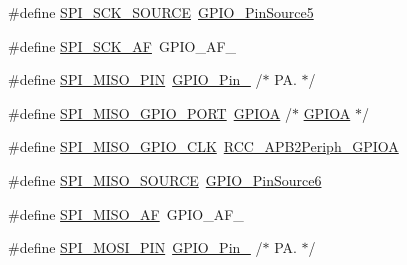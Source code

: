 \begin{DoxyCompactItemize}
\item 
\#define \mbox{\hyperlink{group___s_t_m32_f1_x_x___n_u_c_l_e_o___l_o_w___l_e_v_e_l___s_p_i_ga33462f091911471d16a53fc89f337bca}{S\+P\+I\+\_\+\+S\+C\+K\+\_\+\+S\+O\+U\+R\+CE}}~\mbox{\hyperlink{group___g_p_i_o___pin__sources_gaf231e680fe2db4ea44a7fd0f5d5c5875}{G\+P\+I\+O\+\_\+\+Pin\+Source5}}
\item 
\#define \mbox{\hyperlink{group___s_t_m32_f1_x_x___n_u_c_l_e_o___l_o_w___l_e_v_e_l___s_p_i_ga79bd6531cc6913eeae2c8e1b8375d9e3}{S\+P\+I\+\_\+\+S\+C\+K\+\_\+\+AF}}~G\+P\+I\+O\+\_\+\+A\+F\+\_
\item 
\#define \mbox{\hyperlink{group___s_t_m32_f1_x_x___n_u_c_l_e_o___l_o_w___l_e_v_e_l___s_p_i_ga315722498711fce1e1aa6ea6654385cf}{S\+P\+I\+\_\+\+M\+I\+S\+O\+\_\+\+P\+IN}}~\mbox{\hyperlink{group___g_p_i_o__pins__define_gaf047899d873f27c2db9f50b342e35a58}{G\+P\+I\+O\+\_\+\+Pin\+\_}}                  /$\ast$ P\+A. $\ast$/
\item 
\#define \mbox{\hyperlink{group___s_t_m32_f1_x_x___n_u_c_l_e_o___l_o_w___l_e_v_e_l___s_p_i_ga7c73b5516fc191a0050bf4592cd648d5}{S\+P\+I\+\_\+\+M\+I\+S\+O\+\_\+\+G\+P\+I\+O\+\_\+\+P\+O\+RT}}~\mbox{\hyperlink{group___peripheral__declaration_gac485358099728ddae050db37924dd6b7}{G\+P\+I\+OA}}                       /$\ast$ \mbox{\hyperlink{group___peripheral__declaration_gac485358099728ddae050db37924dd6b7}{G\+P\+I\+OA}} $\ast$/
\item 
\#define \mbox{\hyperlink{group___s_t_m32_f1_x_x___n_u_c_l_e_o___l_o_w___l_e_v_e_l___s_p_i_gaecf0405dce1d881f2d9ecb9e40f9ecb1}{S\+P\+I\+\_\+\+M\+I\+S\+O\+\_\+\+G\+P\+I\+O\+\_\+\+C\+LK}}~\mbox{\hyperlink{group___a_p_b2__peripheral_ga44b92fbf2e288796b1acbce2708f3636}{R\+C\+C\+\_\+\+A\+P\+B2\+Periph\+\_\+\+G\+P\+I\+OA}}
\item 
\#define \mbox{\hyperlink{group___s_t_m32_f1_x_x___n_u_c_l_e_o___l_o_w___l_e_v_e_l___s_p_i_ga178d4862e1bc8af450c3dabcd27c0ff7}{S\+P\+I\+\_\+\+M\+I\+S\+O\+\_\+\+S\+O\+U\+R\+CE}}~\mbox{\hyperlink{group___g_p_i_o___pin__sources_gada41b6bd03b2873a2400628df0a1026e}{G\+P\+I\+O\+\_\+\+Pin\+Source6}}
\item 
\#define \mbox{\hyperlink{group___s_t_m32_f1_x_x___n_u_c_l_e_o___l_o_w___l_e_v_e_l___s_p_i_ga2827f5955adc05e0505e5b19f8eec813}{S\+P\+I\+\_\+\+M\+I\+S\+O\+\_\+\+AF}}~G\+P\+I\+O\+\_\+\+A\+F\+\_
\item 
\#define \mbox{\hyperlink{group___s_t_m32_f1_x_x___n_u_c_l_e_o___l_o_w___l_e_v_e_l___s_p_i_ga67d2c0b6e0ecbd0351958756e4830172}{S\+P\+I\+\_\+\+M\+O\+S\+I\+\_\+\+P\+IN}}~\mbox{\hyperlink{group___g_p_i_o__pins__define_ga7346b6ce5507bd28a7a79e7dcc816c08}{G\+P\+I\+O\+\_\+\+Pin\+\_}}                  /$\ast$ P\+A. $\ast$/

\end{DoxyCompactItemize}

